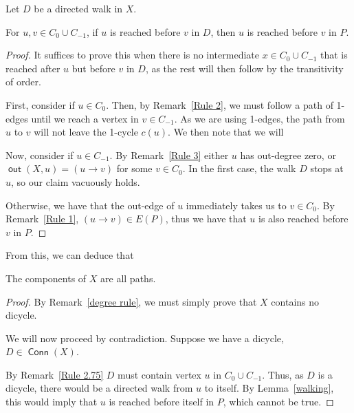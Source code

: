 \documentclass{article}
\DeclareMathOperator{\out}{\bm{\mathsf{out}}}
\DeclareMathOperator{\Conn}{\bm{\mathsf{Conn}}}
\newcommand{\hide}[1]{}
\begin{document}
\begin{lem}\label{walking} Let $D$ be a directed walk in $X$.

For $u,v \in C_0 \cup C_{-1}$, if $u$ is reached before $v$ in $D$, then $u$ is reached before $v$ in $P$.
\begin{proof}

It suffices to prove this when there is no intermediate $x \in C_0 \cup C_{-1}$ that is reached after $u$ but before $v$ in $D$, as the rest will then follow by the transitivity of order.

\vspace{.75em}
First, consider if $u \in C_0$. Then, by Remark~\ref{Rule 2}, we must follow a path of 1-edges until we reach a vertex in $v \in C_{-1}$. As we are using 1-edges, the path from $u$ to $v$ will not leave the 1-cycle $c(u)$. We then note that we will

\vspace{.75em}
Now, consider if $u \in C_{-1}$. By Remark~\ref{Rule 3} either $u$ has out-degree zero, or $\out(X,u) = (u \to v)$ for some $v \in C_0$. In the first case, the walk $D$ stops at $u$, so our claim vacuously holds. 

Otherwise, we have that the out-edge of $u$ immediately takes us to $v \in C_0$. By Remark~\ref{Rule 1}, $(u \to v) \in E(P)$, thus we have that $u$ is also reached before $v$ in $P$.
\end{proof}
\end{lem}

\vspace{1.75em}
From this, we can deduce that 
\begin{lem} \label{path rule} The components of $X$ are all paths.

\begin{proof} By Remark~\ref{degree rule}, we must simply prove that $X$ contains no dicycle. \hide{Also by 3.1, we note that directed walks along $X$ are unique, meaning, that starting at a vertex, $v$, there is at most one sequence $v_1,v_2\dots v_i$, such that $v_1 = v$ and $(v_j \to v_{j+1}) \in E(X)$ for all $j$.}

\vspace{0.75em}
We will now proceed by contradiction. Suppose we have a dicycle, $D \in \Conn(X)$.

\vspace{0.75em}
By Remark~\ref{Rule 2.75} $D$ must contain vertex $u$ in $C_0 \cup C_{-1}$. Thus, as $D$ is a dicycle, there would be a directed walk from $u$ to itself. By Lemma~\ref{walking}, this would imply that $u$ is reached before itself in $P$, which cannot be true.
\end{proof}
\end{lem}
\end{document}
